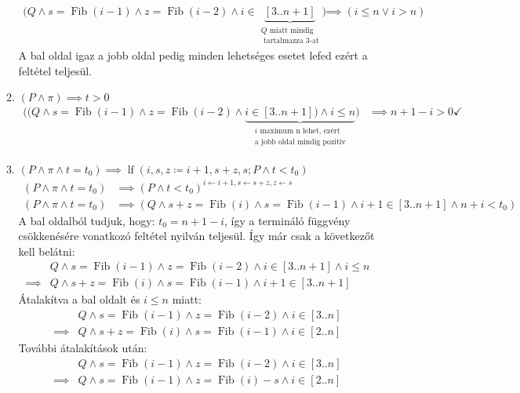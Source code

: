 \documentclass[a4paper,12pt]{article}
\DeclareMathOperator{\lf}{lf}
\begin{document}
\begin{solution}
\begin{enumerate}
\begin{enumerate}
\begin{align*}
					\bigl( Q \land s = \mathop{Fib}(i-1) \land z = \mathop{Fib}(i-2) \land i \in \underbrace{[3..n+1]}_{\substack{Q \text{ miatt mindig} \\ \text{ tartalmazza 3-at}}} \bigr) &\implies (i \le n \lor i > n )
				\end{align*}
				A bal oldal igaz a jobb oldal pedig minden lehetséges esetet lefed ezért a feltétel teljesül. \checkmark
				\item $ (P \land \pi) \implies t > 0 $
				\begin{align*}
					\bigl( ( Q \land s = \mathop{Fib}(i-1) \land z = \mathop{Fib}(i-2) \land \underbrace{ i \in [3..n+1] ) \land i \le n }_{\substack {i \text{ maximum n lehet, ezért} \\ \text{a jobb oldal mindig pozitív}}} \bigr) & \implies n + 1 - i > 0 \checkmark
				\end{align*}
				\item $ (P \land \pi \land t = t_0) \implies \lf(i,s,z \coloneq  i+1,s+z,s; P \land  t < t_0) $
				\begin{align*}
					(P \land \pi \land t = t_0) &\implies (P \land t < t_0)^{i \leftarrow i+1, s \leftarrow s+z,z \leftarrow s} \\
					(P \land \pi \land t = t_0) &\implies (Q \land s+z = \mathop{Fib}(i) \land s = \mathop{Fib}(i-1) \land i+1 \in [3..n+1] \land n + i < t_0  )
				\end{align*}
				A bal oldalból tudjuk, hogy: $ t_0 = n + 1 - i$, így a termináló függvény csökkenésére vonatkozó feltétel nyilván teljesül. Így már csak a következőt kell belátni:
				\begin{align*}
					&Q \land s = \mathop{Fib}(i-1) \land z = \mathop{Fib}(i-2) \land i \in [3..n+1] \land i \le n \\ \implies
					&Q \land s+z = \mathop{Fib}(i) \land s = \mathop{Fib}(i-1) \land i+1 \in [3..n+1]
				\end{align*}
				Átalakítva a bal oldalt és $ i \le n$ miatt:
				\begin{align*}
					&Q \land s = \mathop{Fib}(i-1) \land z = \mathop{Fib}(i-2) \land i \in [3..n] \\ \implies
					&Q \land s+z = \mathop{Fib}(i) \land s = \mathop{Fib}(i-1) \land i \in [2..n]
				\end{align*}
				További átalakítások után:
				\begin{align*}
					&Q \land s = \mathop{Fib}(i-1) \land z = \mathop{Fib}(i-2) \land i \in [3..n] \\ \implies
					&Q \land s = \mathop{Fib}(i-1) \land z = \mathop{Fib}(i) - s \land  i \in [2..n]

\end{align*}
\end{enumerate}
\end{enumerate}
\end{solution}
\end{document}
